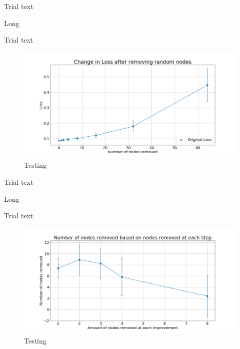 \documentclass[UKenglish]{ifimaster}
\begin{document}
            Trial text

            \begin{table}[h!]
                \centering
                \resizebox{\textwidth}{!}{}
                \caption[Short]{Long}
                \label{tab:loss_rnd_rem_mnist}
            \end{table}

            Trial text

            \begin{figure}[h!]\centering
                \includegraphics[width=\textwidth]{Loss_change_random_removal_mnist.png}
                \caption[Short title]{Testing}
                \label{fig:loss_rn_mnist}
            \end{figure}

            Trial text

            \begin{table}[h!]
                \centering
                \resizebox{\textwidth}{!}{}
                \caption[Short]{Long}
                \label{tab:nr_rnd_rem_imp_mnist}
            \end{table}

            Trial text

            \begin{figure}[h!]\centering
                \includegraphics[width=\textwidth]{Num_rem_vs_size_removed_mnist.png}
                \caption[Short title]{Testing}
                \label{fig:num_rem_rn_imp_mnist}
            \end{figure}
\end{document}
